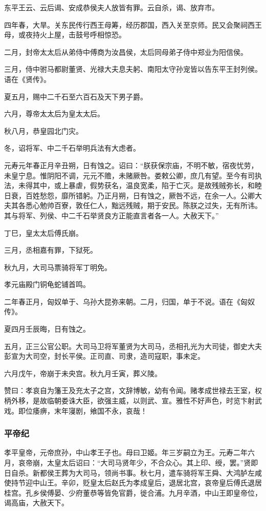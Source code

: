 \documentclass[]{article}
\begin{document}
东平王云、云后谒、安成恭侯夫人放皆有罪。云自杀，谒、放弃市。

四年春，大旱。关东民传行西王母筹，经历郡国，西入关至京师。民又会聚祠西王母，或夜持火上屋，击鼓号呼相惊恐。

二月，封帝太太后从弟侍中傅商为汝昌侯，太后同母弟子侍中郑业为阳信侯。

三月，侍中驸马都尉董贤、光禄大夫息夫躬、南阳太守孙宠皆以告东平王封列侯。语在《贤传》。

夏五月，赐中二千石至六百石及天下男子爵。

六月，尊帝太太后为皇太太后。

秋八月，恭皇园北门灾。

冬，诏将军、中二千石举明兵法有大虑者。

元寿元年春正月辛丑朔，日有蚀之。诏曰：``朕获保宗庙，不明不敏，宿夜忧劳，未皇宁息。惟阴阳不调，元元不赡，未赌厥咎。娄敕公卿，庶几有望。至今有司执法，未得其中，或上暴虐，假势获名，温良宽柔，陷于亡灭。是故残贼弥长，和睦日衰，百姓愁怨，靡所错躬。乃正月朔，日有蚀之，厥咎不远，在余一人。公卿大夫其各悉心勉帅百寮，敦任仁人，黜远残贼，期于安民。陈朕之过失，无有所讳。其与将军、列侯、中二千石举贤良方正能直言者各一人。大赦天下。''

丁巳，皇太太后傅氏崩。

三月，丞相嘉有罪，下狱死。

秋九月，大司马票骑将军丁明免。

孝元庙殿门铜龟蛇铺首鸣。

二年春正月，匈奴单于、乌孙大昆弥来朝。二月，归国，单于不说。语在《匈奴传》。

夏四月壬辰晦，日有蚀之。

五月，正三公官公职。大司马卫将军董贤为大司马，丞相孔光为大司徒，御史大夫彭宣为大司空，封长平侯。正司直、司隶，造司寇职，事未定。

六月戊午，帝崩于未央宫。秋九月壬寅，葬义陵。

赞曰：孝哀自为籓王及充太子之宫，文辞博敏，幼有令闻。赌孝成世禄去王室，权柄外移，是故临朝娄诛大臣，欲强主威，以则武、宣。雅性不好声色，时览卞射武戏。即位痿痹，末年寖剧，飨国不永，哀哉！

\hypertarget{header-n1155}{%
\subsubsection{平帝纪}\label{header-n1155}}

孝平皇帝，元帝庶孙，中山孝王子也。母曰卫姬。年三岁嗣立为王。元寿二年六月，哀帝崩，太皇太后诏曰：``大司马贤年少，不合众心。其上印、绶，罢。''贤即日自杀。新都侯王葬为大司马，领尚书事。秋七月，遣车骑将军王舜、大鸿胪左咸使持节迎中山王。辛卯，贬皇太后赵氏为孝成皇后，退居北宫，哀帝皇后傅氏退居桂宫。孔乡侯傅晏、少府董恭等皆免官爵，徙合浦。九月辛酒，中山王即皇帝位，谒高庙，大赦天下。
\end{document}

